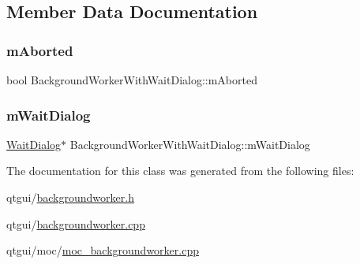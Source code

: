 \subsection{Member Data Documentation}
\mbox{\label{class_background_worker_with_wait_dialog_a094856291ffb7aba4208b1af90866152}} 
\subsubsection{\texorpdfstring{mAborted}{mAborted}}
{\footnotesize\ttfamily bool Background\+Worker\+With\+Wait\+Dialog\+::m\+Aborted\hspace{0.3cm}{\ttfamily [protected]}}

\mbox{\label{class_background_worker_with_wait_dialog_a3825f39e47aead7395fc48996da7641a}} 
\subsubsection{\texorpdfstring{mWaitDialog}{mWaitDialog}}
{\footnotesize\ttfamily \mbox{\hyperlink{class_wait_dialog}{Wait\+Dialog}}$\ast$ Background\+Worker\+With\+Wait\+Dialog\+::m\+Wait\+Dialog\hspace{0.3cm}{\ttfamily [protected]}}



The documentation for this class was generated from the following files\+:\begin{DoxyCompactItemize}
\item 
qtgui/\mbox{\hyperlink{backgroundworker_8h}{backgroundworker.\+h}}\item 
qtgui/\mbox{\hyperlink{backgroundworker_8cpp}{backgroundworker.\+cpp}}\item 
qtgui/moc/\mbox{\hyperlink{moc__backgroundworker_8cpp}{moc\+\_\+backgroundworker.\+cpp}}\end{DoxyCompactItemize}
